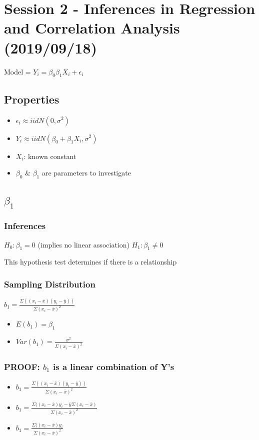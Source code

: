 \documentclass[11pt]{article}
\begin{document}
\section{Session 2 - Inferences in Regression and Correlation Analysis (2019/09/18)}
\label{sec:orgabd273d}

Model = \(Y_i = \beta_0 \beta_1 X_i + \epsilon_i\)
\subsection{Properties}
\label{sec:orgb690e7c}
\begin{itemize}
\item \(\epsilon_i \approx iid N(0, \sigma^2)\)
\item \(Y_i \approx iid N(\beta_0 + \beta_1 X_i, \sigma^2)\)
\item \(X_i\): known constant
\item \(\beta_0\) \& \(\beta_1\) are parameters to investigate
\end{itemize}
\subsection{\(\beta_1\)}
\label{sec:orgaf57fd9}
\subsubsection{Inferences}
\label{sec:orgdf73a80}
\(H_0: \beta_1 = 0\) (implies no linear association)
\(H_1: \beta_1 \neq 0\)

This hypothesis test determines if there is a relationship

\subsubsection{Sampling Distribution}
\label{sec:orgb671779}
\(b_1 = \frac{\Sigma((x_i - \bar{x})(y_i - \bar{y} ))}{\Sigma(x_i - \bar{x})^2}\)

\begin{itemize}
\item \(E(b_1) = \beta_1\)
\item \(Var(b_1) = \frac{\sigma^2}{\Sigma(x_i - \bar{x})^2}\)
\end{itemize}

\subsubsection{PROOF: \(b_1\) is a linear combination of Y's}
\label{sec:org14c882e}
\begin{itemize}
\item \(b_1 = \frac{\Sigma((x_i - \bar{x})(y_i - \bar{y} ))}{\Sigma(x_i - \bar{x})^2}\)
\item \(b_1 = \frac{\Sigma((x_i - \bar{x}) y_i - \bar{y} \Sigma(x_i - \bar{x})}{\Sigma(x_i - \bar{x})^2}\)
\item \(b_1 = \frac{\Sigma((x_i - \bar{x}) y_i}{\Sigma(x_i - \bar{x})^2}\)
\end{itemize}
\end{document}
